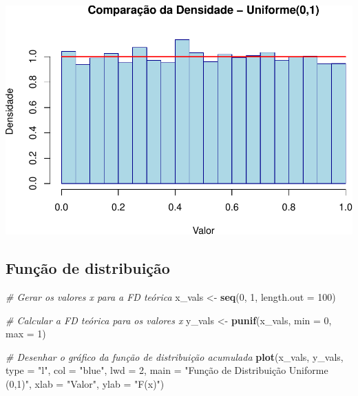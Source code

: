 \documentclass[
]{book}
\newenvironment{Shaded}{\begin{snugshade}}{\end{snugshade}}
\newcommand{\AttributeTok}[1]{\textcolor[rgb]{0.13,0.29,0.53}{#1}}
\newcommand{\CommentTok}[1]{\textcolor[rgb]{0.56,0.35,0.01}{\textit{#1}}}
\newcommand{\DecValTok}[1]{\textcolor[rgb]{0.00,0.00,0.81}{#1}}
\newcommand{\FunctionTok}[1]{\textcolor[rgb]{0.13,0.29,0.53}{\textbf{#1}}}
\newcommand{\NormalTok}[1]{#1}
\newcommand{\OtherTok}[1]{\textcolor[rgb]{0.56,0.35,0.01}{#1}}
\newcommand{\StringTok}[1]{\textcolor[rgb]{0.31,0.60,0.02}{#1}}
\theoremstyle{definition}
\theoremstyle{definition}
\theoremstyle{definition}
\theoremstyle{definition}
\theoremstyle{remark}
\begin{document}
\includegraphics{meuLivro2_files/figure-latex/unnamed-chunk-120-1.pdf}

\subsection{Função de distribuição}\label{funuxe7uxe3o-de-distribuiuxe7uxe3o-2}

\begin{Shaded}
\begin{Highlighting}[]
\CommentTok{\# Gerar os valores x para a FD teórica}
\NormalTok{x\_vals }\OtherTok{\textless{}{-}} \FunctionTok{seq}\NormalTok{(}\DecValTok{0}\NormalTok{, }\DecValTok{1}\NormalTok{, }\AttributeTok{length.out =} \DecValTok{100}\NormalTok{)}

\CommentTok{\# Calcular a FD teórica para os valores x}
\NormalTok{y\_vals }\OtherTok{\textless{}{-}} \FunctionTok{punif}\NormalTok{(x\_vals, }\AttributeTok{min =} \DecValTok{0}\NormalTok{, }\AttributeTok{max =} \DecValTok{1}\NormalTok{)}

\CommentTok{\# Desenhar o gráfico da função de distribuição acumulada}
\FunctionTok{plot}\NormalTok{(x\_vals, y\_vals, }\AttributeTok{type =} \StringTok{"l"}\NormalTok{, }
     \AttributeTok{col =} \StringTok{"blue"}\NormalTok{, }\AttributeTok{lwd =} \DecValTok{2}\NormalTok{, }
     \AttributeTok{main =} \StringTok{"Função de Distribuição Uniforme (0,1)"}\NormalTok{,}
     \AttributeTok{xlab =} \StringTok{"Valor"}\NormalTok{, }\AttributeTok{ylab =} \StringTok{"F(x)"}\NormalTok{)}
\end{Highlighting}
\end{Shaded}
\end{document}
